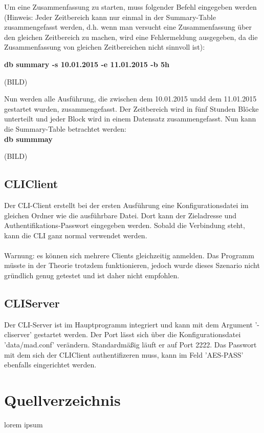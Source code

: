 \documentclass[12pt,a4paper]{report}
\begin{document}
Um eine Zusammenfassung zu starten, muss folgender Befehl eingegeben werden (Hinweis: Jeder Zeitbereich kann nur einmal in der Summary-Table zusammengefasst werden, d.h. wenn man versucht eine Zusammenfassung über den gleichen Zeitbereich zu machen, wird eine Fehlermeldung ausgegeben, da die Zusammenfassung von gleichen Zeitbereichen nicht sinnvoll ist):

\textbf{db summary -s 10.01.2015 -e 11.01.2015 -b 5h}

(BILD)

Nun werden alle Ausführung, die zwischen dem 10.01.2015 undd dem 11.01.2015 gestartet wurden, zusammengefasst. Der Zeitbereich wird in fünf Stunden Blöcke unterteilt und jeder Block wird in einem Datensatz zusammengefasst. Nun kann die Summary-Table betrachtet werden:\\

\textbf{db summmay}

(BILD)

\chapter{CLIClient}

Der CLI-Client erstellt bei der ersten Ausführung eine Konfigurationsdatei im gleichen Ordner wie die ausführbare Datei. Dort kann der Zieladresse und Authentifikations-Passwort eingegeben werden. Sobald die Verbindung steht, kann die CLI ganz normal verwendet werden.\\\\
Warnung: es können sich mehrere Clients gleichzeitig anmelden. Das Programm müsste in der Theorie trotzdem funktionieren, jedoch wurde dieses Szenario nicht gründlich genug getestet und ist daher nicht empfohlen.

\chapter{CLIServer}

Der CLI-Server ist im Hauptprogramm integriert und kann mit dem Argument '-cliserver' gestartet werden. Der Port lässt sich über die Konfigurationsdatei 'data/mad.conf' verändern. Standardmäßig läuft er auf Port 2222. Das Passwort mit dem sich der CLIClient authentifizeren muss, kann im Feld 'AES-PASS' ebenfalls eingerichtet werden.

\part{Quellverzeichnis}
lorem ipsum
\end{document}
